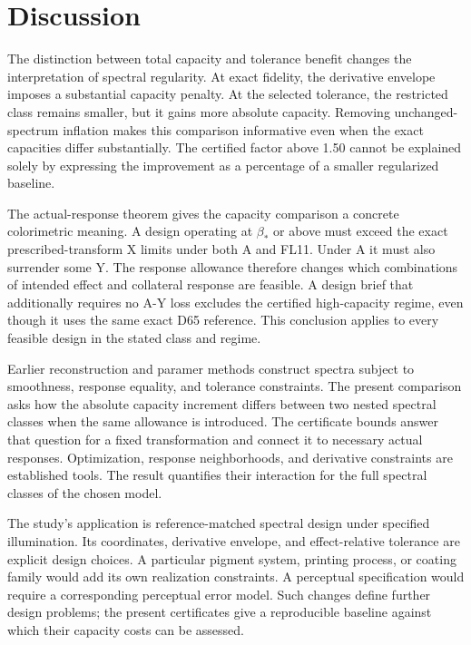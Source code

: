 \documentclass{optica-article}
\begin{document}
\section{Discussion}
The distinction between total capacity and tolerance benefit changes the interpretation of spectral regularity. At exact fidelity, the derivative envelope imposes a substantial capacity penalty. At the selected tolerance, the restricted class remains smaller, but it gains more absolute capacity. Removing unchanged-spectrum inflation makes this comparison informative even when the exact capacities differ substantially. The certified factor above 1.50 cannot be explained solely by expressing the improvement as a percentage of a smaller regularized baseline.

The actual-response theorem gives the capacity comparison a concrete colorimetric meaning. A design operating at $\beta_*$ or above must exceed the exact prescribed-transform X limits under both A and FL11. Under A it must also surrender some Y. The response allowance therefore changes which combinations of intended effect and collateral response are feasible. A design brief that additionally requires no A-Y loss excludes the certified high-capacity regime, even though it uses the same exact D65 reference. This conclusion applies to every feasible design in the stated class and regime.

Earlier reconstruction and paramer methods construct spectra subject to smoothness, response equality, and tolerance constraints. The present comparison asks how the absolute capacity increment differs between two nested spectral classes when the same allowance is introduced. The certificate bounds answer that question for a fixed transformation and connect it to necessary actual responses. Optimization, response neighborhoods, and derivative constraints are established tools. The result quantifies their interaction for the full spectral classes of the chosen model.

The study's application is reference-matched spectral design under specified illumination. Its coordinates, derivative envelope, and effect-relative tolerance are explicit design choices. A particular pigment system, printing process, or coating family would add its own realization constraints. A perceptual specification would require a corresponding perceptual error model. Such changes define further design problems; the present certificates give a reproducible baseline against which their capacity costs can be assessed.
\end{document}

